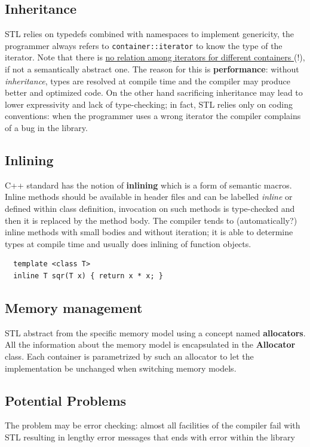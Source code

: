 \subsection{Inheritance}
STL relies on typedefs combined with namespaces to
implement genericity, the programmer always refers to \lstinline|container::iterator| to know the type of the iterator.
Note that there is \ul{no relation among iterators for different containers }(!), if not a semantically abstract one.
The reason for this is \textbf{performance}: 
without \textit{inheritance}, types are resolved at compile time and the compiler may produce better and optimized code.
On the other hand sacrificing inheritance may lead to
lower expressivity and lack of type-checking;
in fact, STL relies only on coding conventions:
when the programmer uses a wrong iterator the compiler complains of a bug in the library.

\subsection{Inlining}
C++ standard has the notion of \textbf{inlining} which is a form of semantic macros.
Inline methods should be available in header files
and can be labelled \textit{inline} or defined within class
definition, invocation on such methods is type-checked and then it is
replaced by the method body.
The compiler tends to (automatically?)
inline methods with small bodies and without iteration; 
it is able to determine types at compile
time and usually does inlining of function objects.

\lstset{language=C++}
\begin{lstlisting}
  template <class T>
  inline T sqr(T x) { return x * x; }
\end{lstlisting}

\lstset{style=javaBlockAnn}

\subsection{Memory management}
STL abstract from the specific memory model using a concept named \textbf{allocators}.
All the information about the memory model is
encapsulated in the \textbf{Allocator} class.
Each container is parametrized by such an allocator to let
the implementation be unchanged when switching
memory models.

\subsection{Potential Problems}
The problem may be error checking: 
almost all facilities of the compiler fail with STL resulting in lengthy error messages that ends with error within the library
